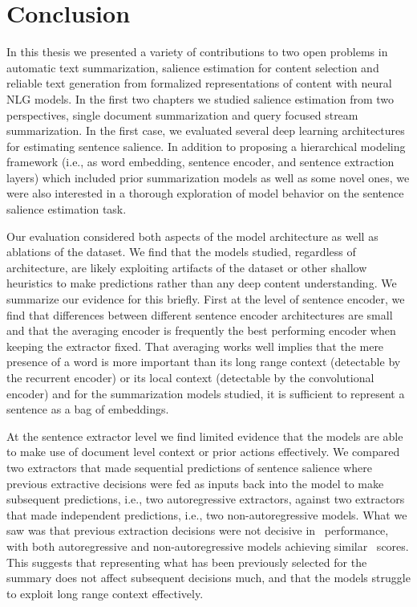 \chapter{Conclusion}
\label{ch:conclusion}

In this thesis we presented a variety of contributions to two open
problems in automatic text summarization, salience estimation for content
selection and reliable text generation from formalized representations of
content with neural NLG models.  In the first two chapters we studied salience
estimation from two perspectives, single document summarization and query
focused stream summarization. In the first case, we evaluated several deep
learning architectures for estimating sentence salience. In addition to
proposing a hierarchical modeling framework (i.e., as word embedding, sentence
encoder, and sentence extraction layers) which included prior summarization
models as well as some novel ones, we were also interested in a thorough
exploration of model behavior on the sentence salience estimation task.

Our evaluation considered both aspects of the model architecture as well as
ablations of the dataset. We find that the models studied, regardless of
architecture, are likely exploiting artifacts of the dataset or other shallow
heuristics to make predictions rather than any deep content understanding.  We
summarize our evidence for this briefly. First at the level of sentence
encoder, we find that differences between different sentence encoder
architectures are small and that the averaging encoder is frequently the best
performing encoder when keeping the extractor fixed. That averaging works well
implies that the mere presence of a word is more important than its long range
context (detectable by the recurrent encoder) or its local context (detectable
by the convolutional encoder) and for the summarization models studied, it is
sufficient to represent a sentence as a bag of embeddings. 

At the sentence extractor level we find limited evidence that the models are
able to make use of document level context or prior actions effectively.  We
compared two extractors that made sequential predictions of sentence salience
where previous extractive decisions were fed as inputs back into the model to
make subsequent predictions, i.e., two autoregressive extractors, against two
extractors that made independent predictions, i.e., two non-autoregressive
models. What we saw was that previous extraction decisions were not decisive in
\rouge~performance, with both autoregressive and non-autoregressive models
achieving similar \rouge~scores. This suggests that representing what has been
previously selected for the summary does not affect subsequent decisions much,
and that the models struggle to exploit long range context effectively.

